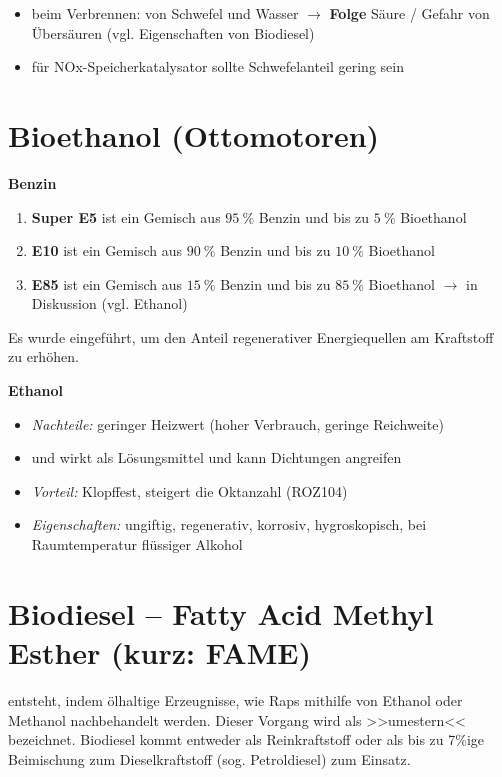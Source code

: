 \begin{itemize}
\item
  beim Verbrennen: von Schwefel und Wasser $\to$ \textbf{Folge} Säure
  / Gefahr von Übersäuren (vgl. Eigenschaften von Biodiesel)
\item
  für NOx-Speicherkatalysator sollte Schwefelanteil gering sein
\end{itemize}

\section{Bioethanol (Ottomotoren)}\label{bioethanol-ottomotoren}

\textbf{Benzin}

\begin{enumerate}
\item
  \textbf{Super E5} ist ein Gemisch aus $95~\%$ Benzin und bis zu
  $5~\%$ Bioethanol
\item
  \textbf{E10} ist ein Gemisch aus $90~\%$ Benzin und bis zu $10~\%$
  Bioethanol
\item
  \textbf{E85} ist ein Gemisch aus $15~\%$ Benzin und bis zu $85~\%$
  Bioethanol $\to$ in Diskussion (vgl. Ethanol)
\end{enumerate}

Es wurde eingeführt, um den Anteil regenerativer Energiequellen am
Kraftstoff zu erhöhen.

\textbf{Ethanol}

\begin{itemize}
\item
  \emph{Nachteile:} geringer Heizwert (hoher Verbrauch, geringe
  Reichweite)
\item
  und wirkt als Lösungsmittel und kann Dichtungen angreifen
\item
  \emph{Vorteil:} Klopffest, steigert die Oktanzahl (ROZ104)
\item
  \emph{Eigenschaften:} ungiftig, regenerativ, korrosiv, hygroskopisch,
  bei Raumtemperatur flüssiger Alkohol
\end{itemize}

\section{Biodiesel -- Fatty Acid Methyl Esther (kurz:
FAME)}\label{biodiesel-fatty-acid-methyl-esther-kurz-fame}

entsteht, indem ölhaltige Erzeugnisse, wie Raps mithilfe von Ethanol
oder Methanol nachbehandelt werden. Dieser Vorgang wird als >>umestern<<
bezeichnet. Biodiesel kommt entweder als Reinkraftstoff oder als bis zu
7\%ige Beimischung zum Dieselkraftstoff (sog. Petroldiesel) zum Einsatz.

